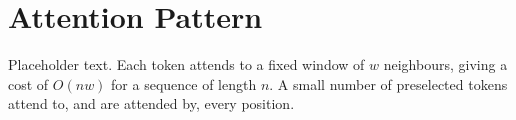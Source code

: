 \section{Attention Pattern}

Placeholder text. Each token attends to a fixed window of $w$ neighbours, giving a cost of $O(n w)$ for a sequence of length $n$. A small number of preselected tokens attend to, and are attended by, every position.
